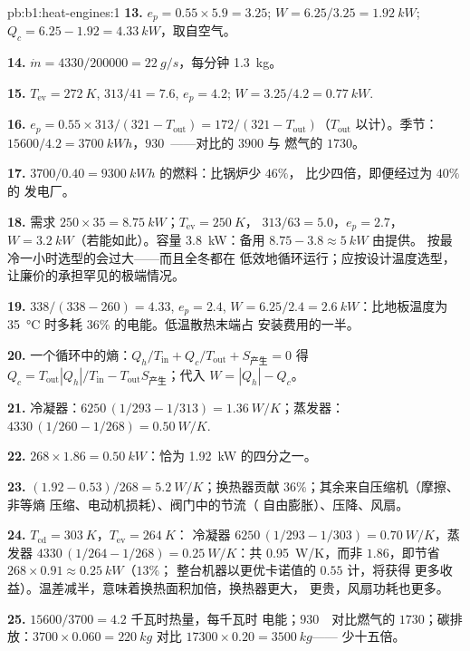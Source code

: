 \begin{solution}{pb:b1:heat-engines:1}
\textbf{13.} $e_p = 0.55 \times 5.9 = 3.25$; $W = 6.25/3.25 = \qty{1.92}{kW}$;
$Q_c = 6.25 - 1.92 = \qty{4.33}{kW}$，取自空气。

\textbf{14.} $\dot m = 4330/200000 = \qty{22}{g/s}$，每分钟 \qty{1.3}{kg}。

\textbf{15.} $T_{\mathrm{ev}} = \qty{272}{K}$, $313/41 = 7.6$, $e_p = 4.2$;
$W = 3.25/4.2 = \qty{0.77}{kW}$.

\textbf{16.} $e_p = 0.55 \times 313/(321 - T_{\mathrm{out}}) = 172/(321 -
T_{\mathrm{out}})$（$T_{\mathrm{out}}$ 以计）。季节：$15600/4.2 =
\qty{3700}{kW h}$，$930$~\texteuro——对比的 $3900$ 与
燃气的 $1730$。

\textbf{17.} $3700/0.40 = \qty{9300}{kW h}$ 的燃料：比锅炉少 $46\%$，
比少四倍，即便经过为 $40\%$ 的
发电厂。

\textbf{18.} 需求 $250 \times 35 = \qty{8.75}{kW}$；$T_{\mathrm{ev}} = \qty{250}{K}$，
$313/63 = 5.0$，$e_p = 2.7$，$W = \qty{3.2}{kW}$（若能如此）。容量
\qty{3.8}{kW}：备用 $8.75 - 3.8 \approx \qty{5}{kW}$ 由提供。
按最冷一小时选型的会过大——而且全冬都在
低效地循环运行；应按设计温度选型，
让廉价的承担罕见的极端情况。

\textbf{19.} $338/(338 - 260) = 4.33$, $e_p = 2.4$, $W = 6.25/2.4 =
\qty{2.6}{kW}$：比地板温度为
\qty{35}{\degreeCelsius} 时多耗 $36\%$ 的电能。低温散热末端占
安装费用的一半。

\textbf{20.} 一个循环中的熵：$Q_h/T_{\mathrm{in}} + Q_c/T_{\mathrm{out}} +
S_{\text{产生}} = 0$ 得 $Q_c = T_{\mathrm{out}}|Q_h|/T_{\mathrm{in}} -
T_{\mathrm{out}}S_{\text{产生}}$；代入 $W = |Q_h| - Q_c$。

\textbf{21.} 冷凝器：$6250\,(1/293 - 1/313) = \qty{1.36}{W/K}$；蒸发器：
$4330\,(1/260 - 1/268) = \qty{0.50}{W/K}$.

\textbf{22.} $268 \times 1.86 = \qty{0.50}{kW}$：恰为
\qty{1.92}{kW} 的四分之一。

\textbf{23.} $(1.92 - 0.53)/268 = \qty{5.2}{W/K}$；换热器贡献
$36\%$；其余来自压缩机（摩擦、非等熵
压缩、电动机损耗）、阀门中的节流（
自由膨胀）、压降、风扇。

\textbf{24.} $T_{\mathrm{cd}} = \qty{303}{K}$，$T_{\mathrm{ev}} = \qty{264}{K}$：
冷凝器 $6250\,(1/293 - 1/303) = \qty{0.70}{W/K}$，蒸发器
$4330\,(1/264 - 1/268) = \qty{0.25}{W/K}$：共 \qty{0.95}{W/K}，而非
$1.86$，即节省 $268 \times 0.91 \approx \qty{0.25}{kW}$（$13\%$；
整台机器以更优卡诺值的 $0.55$ 计，将获得
更多收益）。温差减半，意味着换热面积加倍，换热器更大，
更贵，风扇功耗也更多。

\textbf{25.} $15600/3700 = 4.2$ 千瓦时热量，每千瓦时
电能；$930$~\texteuro\ 对比燃气的 $1730$；碳排放：$3700
\times 0.060 = \qty{220}{kg}$ 对比 $17300 \times 0.20 = \qty{3500}{kg}$——
少十五倍。
\end{solution}
